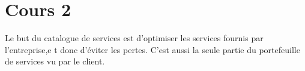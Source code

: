 \section{Cours 2}
Le but du catalogue de services est d'optimiser les services fournis par l'entreprise,e t donc d'\'eviter les pertes.
C'est aussi la seule partie du portefeuille de services vu par le client.
